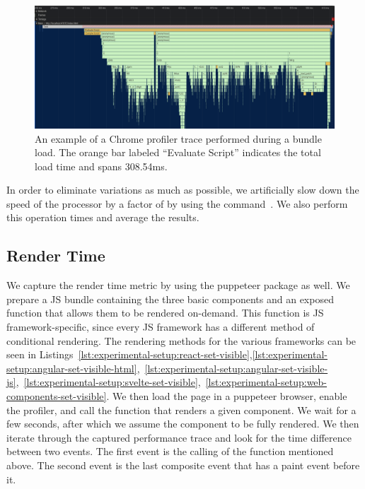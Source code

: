\begin{figure}[h]
	\includegraphics[width=\columnwidth]{figures/experimental-setup/load-time.png}
	\caption{An example of a Chrome profiler trace performed during a bundle load. The orange bar labeled ``Evaluate Script'' indicates the total load time and spans 308.54ms.}
	\label{fig:experimental-setup:load-time}
	\centering
\end{figure}

In order to eliminate variations as much as possible, we artificially slow down the speed of the processor by a factor of \slowdownFactorLoadTime{} by using the  command~. We also perform this operation \loadTimePerformanceMeasures{} times and average the results.

\subsection{Render Time}
We capture the render time metric by using the puppeteer package as well. We prepare a JS bundle containing the three basic components and an exposed function that allows them to be rendered on-demand. This function is JS framework-specific, since every JS framework has a different method of conditional rendering. The rendering methods for the various frameworks can be seen in Listings~\ref{lst:experimental-setup:react-set-visible},\ref{lst:experimental-setup:angular-set-visible-html},~\ref{lst:experimental-setup:angular-set-visible-js},~\ref{lst:experimental-setup:svelte-set-visible},~\ref{lst:experimental-setup:web-components-set-visible}. We then load the page in a puppeteer browser, enable the profiler, and call the function that renders a given component. We wait for a few seconds, after which we assume the component to be fully rendered. We then iterate through the captured performance trace and look for the time difference between two events. The first event is the calling of the function mentioned above. The second event is the last composite event that has a paint event before it.

